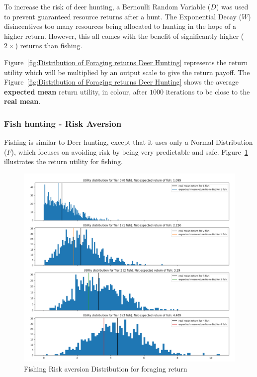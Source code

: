 To increase the risk of deer hunting, a Bernoulli Random Variable ($D$) was used to prevent guaranteed resource returns after a hunt. The Exponential Decay ($W$) disincentives too many resources being allocated to hunting in the hope of a higher return. However, this all comes with the benefit of significantly higher ($2\times$) returns than fishing.

Figure~\ref{fig:Distribution of Foraging returns Deer Hunting} represents the return utility which will be multiplied by an output scale to give the return payoff. The Figure~\ref{fig:Distribution of Foraging returns Deer Hunting} shows the average \textbf{expected mean} return utility, in colour, after $1000$ iterations to be close to the \textbf{real mean}.

\newpage
\subsubsection{Fish hunting - Risk Aversion}

Fishing is similar to Deer hunting, except that it uses only a Normal Distribution ($F$), which focuses on avoiding risk by being very predictable and safe. Figure~\ref{fig:Distribution of Foraging returns Fishing} illustrates the return utility for fishing.

\begin{figure}[!htb]
    \centering
    \includegraphics[width=1\textwidth]{04_environment/images/Distribution of Foraging returns Fishing.PNG}
    \caption{Fishing Risk aversion Distribution for foraging return}
    \label{fig:Distribution of Foraging returns Fishing}
\end{figure}

